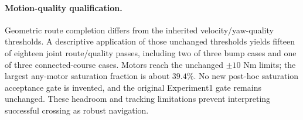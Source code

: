 \paragraph{Motion-quality qualification.} Geometric route completion differs from the inherited velocity/yaw-quality thresholds. A descriptive application of those unchanged thresholds yields fifteen of eighteen joint route/quality passes, including two of three bump cases and one of three connected-course cases. Motors reach the unchanged $\pm10$ Nm limits; the largest any-motor saturation fraction is about $39.4\%$. No new post-hoc saturation acceptance gate is invented, and the original Experiment1 gate remains unchanged. These headroom and tracking limitations prevent interpreting successful crossing as robust navigation.
